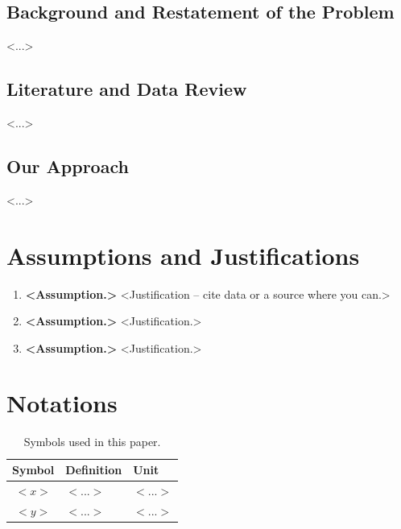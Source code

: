 \documentclass[12pt]{article}            %
\theoremstyle{definition}
\theoremstyle{remark}
\begin{document}
\subsection{Background and Restatement of the Problem}
<...>

\subsection{Literature and Data Review}
<...>

\subsection{Our Approach}
<...>

\section{Assumptions and Justifications}
\begin{enumerate}[label=\textbf{A\arabic*.},leftmargin=*]
  \item \textbf{<Assumption.>} <Justification -- cite data or a source where you can.>
  \item \textbf{<Assumption.>} <Justification.>
  \item \textbf{<Assumption.>} <Justification.>
\end{enumerate}

\section{Notations}
\begin{table}[H]
\centering
\caption{Symbols used in this paper.}
\label{tab:notations}
\begin{tabular}{cll}
\toprule
Symbol & Definition & Unit \\
\midrule
$<x>$  & $<$...$>$ & $<$...$>$ \\
$<y>$  & $<$...$>$ & $<$...$>$ \\
\bottomrule
\end{tabular}
\end{table}
\end{document}
